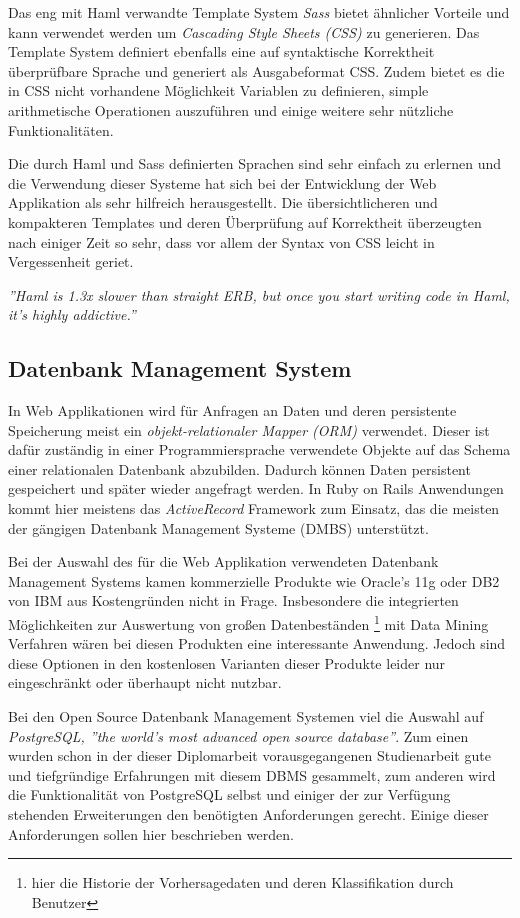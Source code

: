 Das eng mit Haml verwandte Template System \textit{Sass} bietet
ähnlicher Vorteile und kann verwendet werden um \textit{Cascading
  Style Sheets (CSS)} zu generieren. Das Template System definiert
ebenfalls eine auf syntaktische Korrektheit überprüfbare Sprache und
generiert als Ausgabeformat CSS. Zudem bietet es die in CSS nicht
vorhandene Möglichkeit Variablen zu definieren, simple arithmetische
Operationen auszuführen und einige weitere sehr nützliche
Funktionalitäten.

Die durch Haml und Sass definierten Sprachen sind sehr einfach zu
erlernen und die Verwendung dieser Systeme hat sich bei der
Entwicklung der Web Applikation als sehr hilfreich herausgestellt. Die
übersichtlicheren und kompakteren Templates und deren Überprüfung auf
Korrektheit überzeugten nach einiger Zeit so sehr, dass vor allem der
Syntax von CSS leicht in Vergessenheit geriet.

\textit{''Haml is 1.3x slower than straight ERB, but once you start
  writing code in Haml, it’s highly addictive.''}

\subsection{Datenbank Management System}

In Web Applikationen wird für Anfragen an Daten und deren persistente
Speicherung meist ein \textit{objekt-relationaler Mapper (ORM)}
verwendet. Dieser ist dafür zuständig in einer Programmiersprache
verwendete Objekte auf das Schema einer relationalen Datenbank
abzubilden. Dadurch können Daten persistent gespeichert und später
wieder angefragt werden. In Ruby on Rails Anwendungen kommt hier
meistens das \textit{ActiveRecord} Framework zum Einsatz, das die
meisten der gängigen Datenbank Management Systeme (DMBS) unterstützt.

Bei der Auswahl des für die Web Applikation verwendeten Datenbank
Management Systems kamen kommerzielle Produkte wie Oracle's 11g oder
DB2 von IBM aus Kostengründen nicht in Frage. Insbesondere die
integrierten Möglichkeiten zur Auswertung von großen Datenbeständen
\footnote{hier die Historie der Vorhersagedaten und deren
  Klassifikation durch Benutzer} mit Data Mining Verfahren wären bei
diesen Produkten eine interessante Anwendung. Jedoch sind diese
Optionen in den kostenlosen Varianten dieser Produkte leider nur
eingeschränkt oder überhaupt nicht nutzbar.

Bei den Open Source Datenbank Management Systemen viel die Auswahl auf
\textit{PostgreSQL, ''the world's most advanced open source
  database''}. Zum einen wurden schon in der dieser Diplomarbeit
vorausgegangenen Studienarbeit gute und tiefgründige Erfahrungen mit
diesem DBMS gesammelt, zum anderen wird die Funktionalität von
PostgreSQL selbst und einiger der zur Verfügung stehenden
Erweiterungen den benötigten Anforderungen gerecht. Einige dieser
Anforderungen sollen hier beschrieben werden.

